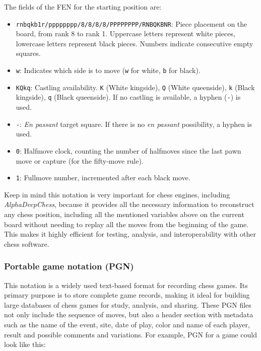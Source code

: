\noindent The fields of the FEN for the starting position are:

\begin{itemize}[itemsep=1pt]
    \item \texttt{rnbqkb1r/pppppppp/8/8/8/8/PPPPPPPP/RNBQKBNR}: Piece placement on the board, from rank 8 to rank 1. Uppercase letters represent white pieces, lowercase letters represent black pieces. Numbers indicate consecutive empty squares.
    \item \texttt{w}: Indicates which side is to move (\texttt{w} for white, \texttt{b} for black).
    \item \texttt{KQkq}: Castling availability. \texttt{K} (White kingside), \texttt{Q} (White queenside), \texttt{k} (Black kingside), \texttt{q} (Black queenside). If no castling is available, a hyphen (\texttt{-}) is used.
    \item \texttt{-}: \textit{En passant} target square. If there is no \textit{en passant} possibility, a hyphen is used.
    \item \texttt{0}: Halfmove clock, counting the number of halfmoves since the last pawn move or capture (for the fifty-move rule).
    \item \texttt{1}: Fullmove number, incremented after each black move.
\end{itemize}

\noindent Keep in mind this notation is very important for chess engines, including \textit{AlphaDeepChess}, because it provides all the necessary information to reconstruct any chess position, including all the mentioned variables above on the current board without needing to replay all the moves from the beginning of the game. This makes it highly efficient for testing, analysis, and interoperability with other chess software.

\subsubsection*{Portable game notation (PGN)}

This notation is a widely used text-based format for recording chess games. Its primary purpose is to store complete game records, making it ideal for building large databases of chess games for study, analysis, and sharing. These PGN files not only include the sequence of moves, but also a header section with metadata such as the name of the event, site, date of play, color and name of each player, result and possible comments and variations. For example, PGN for a game could look like this:

